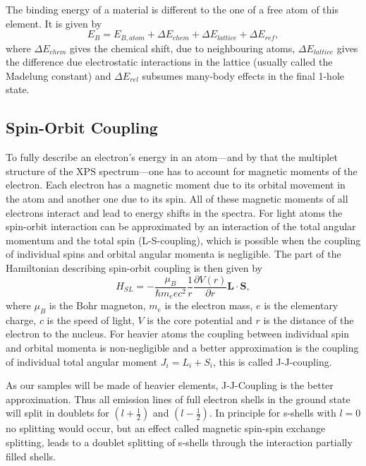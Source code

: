 \documentclass[a4paper,10pt]{scrartcl}
\begin{document}
The binding energy of a material is different to the one of a free atom of this element. It is given by
\begin{equation}
E_{B} = E_{B,atom} + \Delta E_{chem} + \Delta E_{lattice} + \Delta E_{ref}, \label{eq:binding}
\end{equation}
where $\Delta E_{chem}$ gives the chemical shift, due to neighbouring atoms, $\Delta E_{lattice}$ gives the difference due electrostatic interactions in the lattice (usually called the Madelung constant) and $\Delta E_{rel}$ subsumes many-body effects in the final 1-hole state.

\subsection{Spin-Orbit Coupling}

To fully describe an electron's energy in an atom---and by that the multiplet structure of the XPS spectrum---one has to account for magnetic moments of the electron. Each electron has a magnetic moment due to its orbital movement in the atom and another one due to its spin. All of these magnetic moments of all electrons interact and lead to energy shifts in the spectra. For light atoms the spin-orbit interaction can be approximated by an interaction of the total angular momentum and the total spin (L-S-coupling), which is possible when the coupling of individual spins and orbital angular momenta is negligible. The part of the Hamiltonian describing spin-orbit coupling is then given by
\begin{equation}
H_{SL} = - \frac{\mu_B}{\hbar m_e e c^2}\frac{1}{r}\frac{\partial V(r)}{\partial r} \boldsymbol{L}\cdot\boldsymbol{S},
\end{equation}
where $\mu_B$ is the Bohr magneton, $m_e$ is the electron mass, $e$ is the elementary charge, $c$ is the speed of light, $V$ is the core potential and $r$ is the distance of the electron to the nucleus.
For heavier atoms the coupling between individual spin and orbital momenta is non-negligible and a better approximation is the coupling of individual total angular moment $J_i=L_i+S_i$, this is called J-J-coupling. 

As our samples will be made of heavier elements, J-J-Coupling is the better approximation. Thus all emission lines of full electron shells in the ground state will split in doublets for $(l+\tfrac{1}{2})$ and $(l-\tfrac{1}{2})$. In principle for s-shells with $l=0$ no splitting would occur, but an effect called magnetic spin-spin exchange splitting, leads to a doublet splitting of s-shells through the interaction partially filled shells.
\end{document}
